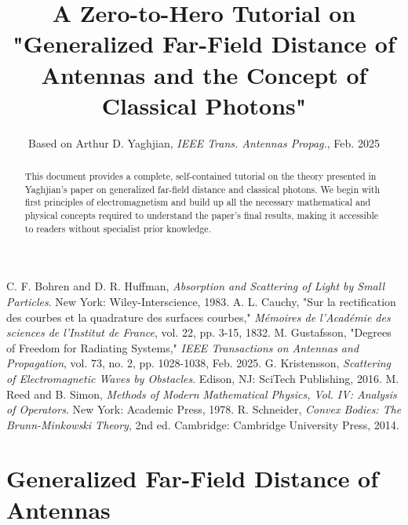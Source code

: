 \documentclass[11pt,a4paper]{article}
\begin{document}
\begin{thebibliography}{9}
     C. F. Bohren and D. R. Huffman, \textit{Absorption and Scattering of Light by Small Particles}. New York: Wiley-Interscience, 1983.
     A. L. Cauchy, "Sur la rectification des courbes et la quadrature des surfaces courbes," \textit{Mémoires de l'Académie des sciences de l'Institut de France}, vol. 22, pp. 3-15, 1832.
     M. Gustafsson, "Degrees of Freedom for Radiating Systems," \textit{IEEE Transactions on Antennas and Propagation}, vol. 73, no. 2, pp. 1028-1038, Feb. 2025.
     G. Kristensson, \textit{Scattering of Electromagnetic Waves by Obstacles}. Edison, NJ: SciTech Publishing, 2016.
     M. Reed and B. Simon, \textit{Methods of Modern Mathematical Physics, Vol. IV: Analysis of Operators}. New York: Academic Press, 1978.
     R. Schneider, \textit{Convex Bodies: The Brunn-Minkowski Theory}, 2nd ed. Cambridge: Cambridge University Press, 2014.
\end{thebibliography}

\newpage


\part{Generalized Far-Field Distance of Antennas}

\title{A Zero-to-Hero Tutorial on "Generalized Far-Field Distance of Antennas and the Concept of Classical Photons"}
\author{Based on Arthur D. Yaghjian, \textit{IEEE Trans. Antennas Propag.}, Feb. 2025}
\date{}
\maketitle

\begin{abstract}
This document provides a complete, self-contained tutorial on the theory presented in Yaghjian's paper on generalized far-field distance and classical photons. We begin with first principles of electromagnetism and build up all the necessary mathematical and physical concepts required to understand the paper's final results, making it accessible to readers without specialist prior knowledge.
\end{abstract}
\end{document}
